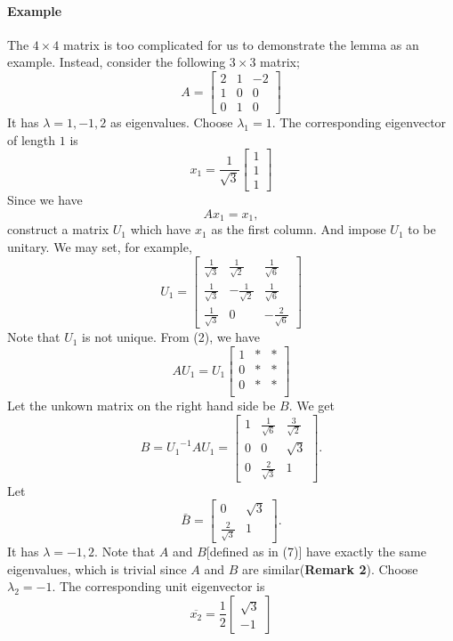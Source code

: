 \documentclass{article}
\begin{document}
\paragraph{Example}
The $4\times 4$ matrix is too complicated for us to demonstrate the lemma as an example.
Instead, consider the following $3\times 3$ matrix;
\[A=\begin{bmatrix}
2&1&-2\\
1&0&0\\
0&1&0
\end{bmatrix}\]
It has $\lambda=1,-1,2$ as eigenvalues.
Choose $\lambda_1=1$.
The corresponding eigenvector of length $1$ is
\[x_1=\frac1{\sqrt3}\begin{bmatrix}1\\1\\1\end{bmatrix}\tag{1}\]
Since we have
\[Ax_1=x_1,\tag{2}\]
construct a matrix $U_1$ which have $x_1$ as the first column.
And impose $U_1$ to be unitary.
We may set, for example,
\[U_1=\begin{bmatrix}
\frac1{\sqrt3}	&\frac1{\sqrt2}	&\frac1{\sqrt6}	\\
\frac1{\sqrt3}	&-\frac1{\sqrt2}	&\frac1{\sqrt6}	\\
\frac1{\sqrt3}	&0				&-\frac2{\sqrt6}	
\end{bmatrix}\]
Note that $U_1$ is not unique.
From (2), we have
\[AU_1=U_1
\begin{bmatrix}
1&*&*\\
0&*&*\\
0&*&*\\
\end{bmatrix}\tag{3}\]
Let the unkown matrix on the right hand side be $B$.
We get
\[B={U_1}^{-1}AU_1=\begin{bmatrix}
1&	\frac1{\sqrt6}	&\frac3{\sqrt2}	\\
0&	0			&\sqrt3			\\
0&	\frac2{\sqrt3}&1
\end{bmatrix}.\]
Let
\[\bar B=\begin{bmatrix}
0			&\sqrt3\\
\frac2{\sqrt3}	&1
\end{bmatrix}.\]
It has $\lambda=-1,2$.
Note that $A$ and $B$[defined as in (7)] have exactly the same eigenvalues, which is trivial since $A$ and $B$ are similar(\textbf{Remark 2}).
Choose $\lambda_2=-1$.
The corresponding unit eigenvector is
\[\overline{x_2}=\frac12\begin{bmatrix}
\sqrt3\\-1\tag{4}
\end{bmatrix}\]
\end{document}
